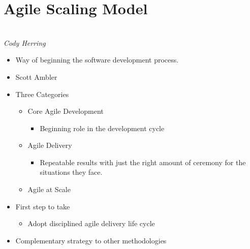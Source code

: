 \documentclass{report}
\begin{document}
		\section{Agile Scaling Model}\\
			\textit{Cody Herring}
			\begin{itemize}
				\item Way of beginning the software development process.
				\item Scott Ambler
				\item Three Categories
					\begin{itemize}
						\item Core Agile Development
							\begin{itemize}
								\item Beginning role in the development cycle
							\end{itemize}
						\item Agile Delivery
							\begin{itemize}
								\item Repeatable results with just the right amount of ceremony for the situations they face.
							\end{itemize}
						\item Agile at Scale
					\end{itemize}
				\item First step to take
					\begin{itemize}
						\item Adopt disciplined agile delivery life cycle
					\end{itemize}
				\item Complementary strategy to other methodologies
			\end{itemize}
\end{document}
